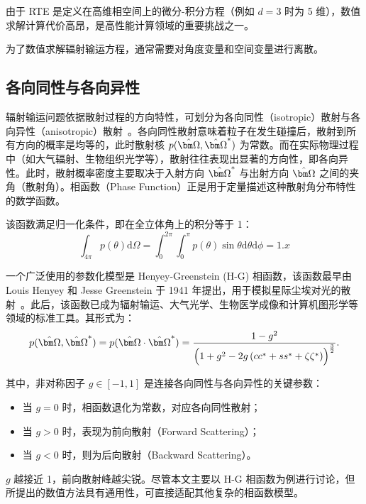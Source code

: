 由于 RTE 是定义在高维相空间上的微分-积分方程（例如 $d=3$ 时为 5 维），数值求解计算代价高昂，是高性能计算领域的重要挑战之一。

为了数值求解辐射输运方程，通常需要对角度变量和空间变量进行离散。

\subsection{各向同性与各向异性}

辐射输运问题依据散射过程的方向特性，可划分为各向同性（isotropic）散射与各向异性（anisotropic）散射~\cite{lathrop1964discrete,wiscombe1977delta}。各向同性散射意味着粒子在发生碰撞后，散射到所有方向的概率是均等的，此时散射核 $p(\bOmega, \bOmega^*)$ 为常数。而在实际物理过程中（如大气辐射、生物组织光学等），散射往往表现出显著的方向性，即各向异性。此时，散射概率密度主要取决于入射方向 $\bOmega^*$ 与出射方向 $\bOmega$ 之间的夹角（散射角）。相函数（Phase Function）正是用于定量描述这种散射角分布特性的数学函数。

该函数满足归一化条件，即在全立体角上的积分等于 1：
\begin{equation}
    \int_{4\pi} p(\theta) \mathrm{d}\Omega = \int_{0}^{2\pi} \int_{0}^{\pi} p(\theta) \sin\theta \mathrm{d}\theta \mathrm{d}\phi = 1.x
\end{equation}

一个广泛使用的参数化模型是 Henyey-Greenstein (H-G) 相函数，该函数最早由 Louis Henyey 和 Jesse Greenstein 于 1941 年提出，用于模拟星际尘埃对光的散射~\cite{henyey1941diffuse}。此后，该函数已成为辐射输运、大气光学、生物医学成像和计算机图形学等领域的标准工具。其形式为：
\begin{equation}
    p(\bOmega,\bOmega^*) = p(\bOmega\cdot\bOmega^*) = \frac{1-g^2}{{\Bigl(1+g^2-2g\,(cc^*+ss^*+\zeta\zeta^*)\Bigr)}^{\frac{3}{2}}}.
\end{equation}

其中，非对称因子 $g \in [-1, 1]$ 是连接各向同性与各向异性的关键参数：
\begin{itemize}
    \item 当 $g=0$ 时，相函数退化为常数，对应各向同性散射；
    \item 当 $g > 0$ 时，表现为前向散射（Forward Scattering）；
    \item 当 $g < 0$ 时，则为后向散射（Backward Scattering）。
\end{itemize}
$g$ 越接近 1，前向散射峰越尖锐。尽管本文主要以 H-G 相函数为例进行讨论，但所提出的数值方法具有通用性，可直接适配其他复杂的相函数模型。

